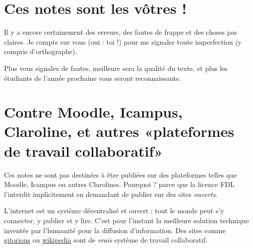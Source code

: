 					\section*{Ces notes sont les vôtres !}


Il y a encore certainement des erreurs, des fautes de frappe et des choses pas claires. Je compte sur vous (oui : toi !) pour me signaler toute imperfection (y compris d'orthographe).

Plus vous signalez de fautes, meilleure sera la qualité du texte, et plus les étudiants de l'année prochaine vous seront reconnaissants.


\section{Contre Moodle, Icampus, Claroline, et autres «plateformes de travail collaboratif»}

Ces notes ne sont pas destinées à être publiées sur des plateformes telles que Moodle, Icampus ou autres Clarolines. Pourquoi ? parce que la licence FDL l'interdit implicitement en demandant de publier sur des sites \emph{ouverts}.

L'internet est un système décentralisé et ouvert : tout le monde peut s'y connecter, y publier et y lire. C'est pour l'instant la meilleure solution technique inventée par l'humanité pour la diffusion d'information. Des sites comme \href{http://gitorious.org}{gitorious} ou \href{http://wikipedia.org}{wikipedia} sont de \emph{vrais} système de travail collaboratif.

